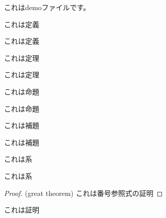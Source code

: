 \documentclass[a4paper]{jsarticle}
\begin{document}
  これはdemoファイルです。
  \begin{definition}[番号あり定義]
    これは定義
  \end{definition}
  \begin{definition*}[番号なし定義]
    これは定義
  \end{definition*}
  \begin{theorem}[番号あり定理]\label{great theorem}
    これは定理
  \end{theorem}
  \begin{theorem*}[番号なし定理]
    これは定理
  \end{theorem*}
  \begin{proposition}[番号あり命題]
    これは命題
  \end{proposition}
  \begin{proposition*}[番号なし命題]
    これは命題
  \end{proposition*}
  \begin{lemma}[番号あり補題]
    これは補題
  \end{lemma}
  \begin{lemma*}[番号なし補題]
    これは補題
  \end{lemma*}
  \begin{corollary}[番号あり系]
    これは系
  \end{corollary}
  \begin{corollary*}[番号なし系]
    これは系
  \end{corollary*}
  \begin{proof}(great theorem)
    これは番号参照式の証明
  \end{proof}
  \begin{proof*}
    これは証明
  \end{proof*}
\end{document}
